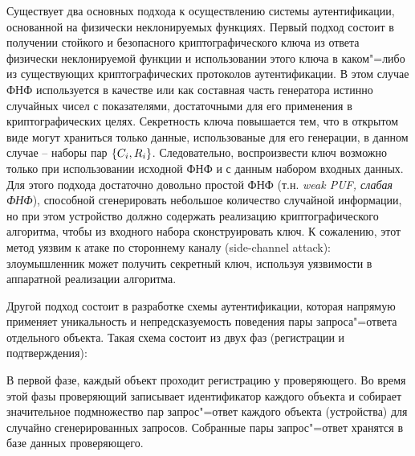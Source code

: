 Существует два основных подхода к осуществлению системы аутентификации, основанной на физически неклонируемых функциях. Первый подход состоит в получении стойкого и безопасного криптографического ключа из ответа физически неклонируемой функции и использовании этого ключа в каком"=либо из существующих криптографических протоколов аутентификации. В этом случае ФНФ используется в качестве или как составная часть генератора истинно случайных чисел с показателями, достаточными для его применения в криптографических целях. Секретность ключа повышается тем, что в открытом виде могут храниться только данные, использованые для его генерации, в данном случае -- наборы пар $\left\{C_i, R_i\right\}$. Следовательно, воспроизвести ключ возможно только при использовании исходной ФНФ и с данным набором входных данных. Для этого подхода достаточно довольно простой ФНФ (т.н. \emph{weak PUF, слабая ФНФ}), способной сгенерировать небольшое количество случайной информации, но при этом устройство должно содержать реализацию криптографического алгоритма, чтобы из входного набора сконструировать ключ. К сожалению, этот метод уязвим к атаке по стороннему каналу (side-channel attack): злоумышленник может получить секретный ключ, используя уязвимости в аппаратной реализации алгоритма.

Другой подход состоит в разработке схемы аутентификации, которая напрямую применяет уникальность и непредсказуемость поведения пары запроса"=ответа отдельного объекта. Такая схема состоит из двух фаз (регистрации и подтверждения):

В первой фазе, каждый объект проходит регистрацию у проверяющего. Во время этой фазы проверяющий записывает идентификатор каждого объекта и собирает значительное подмножество пар запрос"=ответ каждого объекта (устройства) для случайно сгенерированных запросов. Собранные пары запрос"=ответ хранятся в базе данных проверяющего.

